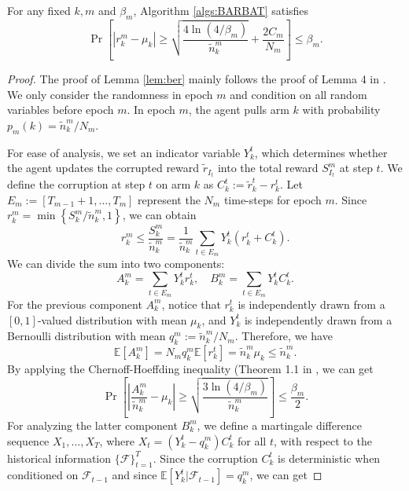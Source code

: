 \begin{lemma}
\label{lem:ber} %
    For any fixed $k, m$ and $\beta_m$, Algorithm \ref{algs:BARBAT} satisfies
    \[\Pr\left[|r_k^m - \mu_k| \geq \sqrt{\frac{4\ln(4 / \beta_m)}{\widetilde{n}_k^m}} + \frac{2C_m}{N_m}\right] \leq \beta_m.\]
\end{lemma}
\begin{proof}
    The proof of Lemma \ref{lem:ber} mainly follows the proof of Lemma 4 in \cite{gupta2019better}.
    We only consider the randomness in epoch $m$ and condition on all random variables before epoch $m$. In epoch $m$, the agent pulls arm $k$ with probability $p_m(k) = \widetilde{n}_k^m / N_m$.

    For ease of analysis, we set an indicator variable $Y_{k}^t$, which determines whether the agent updates the corrupted reward $\widetilde{r}_{I_t}$ into the total reward $S_{I_t}^m$ at step $t$. We define the corruption at step $t$ on arm $k$ as $C_k^t := \widetilde{r}_k^t - r_k^t$. Let $E_m := \left[T_{m-1} + 1,..., T_m\right]$ represent the $N_m$ time-steps for epoch $m$. Since $r_k^m = \min \left\{S_k^m / \widetilde{n}_k^m, 1\right\}$, we can obtain
    \[r_k^m \leq \frac{S_k^m}{\widetilde{n}_k^m} = \frac{1}{\widetilde{n}_k^m}\sum_{t \in E_m}Y_k^t(r_k^t + C_k^t).\]
    We can divide the sum into two components:
    \[A_k^m = \sum_{t \in E_m} Y_k^t r_k^t, \quad B_k^m = \sum_{t \in E_m} Y_k^t C_k^t.\]
    For the previous component $A_k^m$, notice that $r_k^t$ is independently drawn from a $[0,1]$-valued distribution with mean $\mu_k$, and $Y_k^t$ is independently drawn from a Bernoulli distribution with mean $q_k^m := \widetilde{n}_k^m / N_m$. Therefore, we have
    \[\mathbb{E}[A_k^m] = N_m q_k^m \mathbb{E}[r_k^t] = \widetilde{n}_k^m \mu_k \leq \widetilde{n}_k^m.\]
    By applying the Chernoff-Hoeffding inequality (Theorem 1.1 in \cite{dubhashi2009concentration}, 
    we can get
    \begin{equation}
    \label{eqs:Akm}
        \Pr\left[\left|\frac{A_k^m}{\widetilde{n}_k^m} - \mu_k \right| \geq \sqrt{\frac{3\ln(4/\beta_m)}{\widetilde{n}_k^m}}\right] \leq \frac{\beta_m}{2}.
    \end{equation}
    For analyzing the latter component $B_k^m$, we define a martingale difference sequence $X_1,...,X_T$, where $X_t = (Y_k^t - q_k^m) C_k^t$ for all $t$, with respect to the historical information $\{\mathcal{F}\}_{t=1}^T$. Since the corruption $C_k^t$ is deterministic when conditioned on $\mathcal{F}_{t-1}$ and since $\mathbb{E}[Y_k^t | \mathcal{F}_{t-1}] = q_k^m$, we can get

\end{proof}
